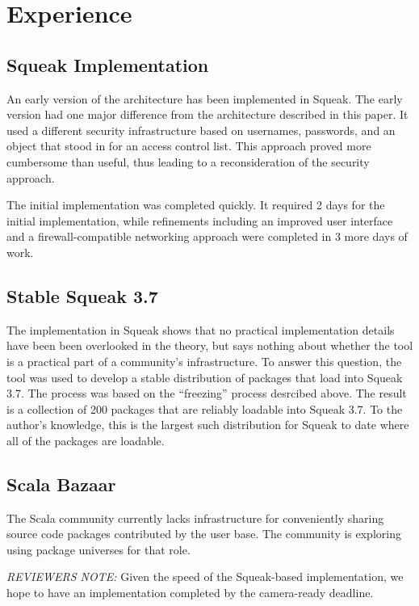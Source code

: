 \documentclass{IEEEtran}
\begin{document}
\section{Experience}
\subsection{Squeak Implementation}
An early version of the architecture has been implemented in Squeak.
The early version had one major difference from the architecture
described in this paper.  It used a different security infrastructure
based on usernames, passwords, and an object that stood in for an
access control list.  This approach proved more cumbersome than
useful, thus leading to a reconsideration of the security approach.

The initial implementation was completed quickly.  It required 2 days
for the initial implementation, while refinements including an
improved user interface and a firewall-compatible networking approach
were completed in 3 more days of work.


\subsection{Stable Squeak 3.7}
The implementation in Squeak shows that no practical implementation
details have been been overlooked in the theory, but says nothing
about whether the tool is a practical part of a community's
infrastructure.  To answer this question, the tool was used to develop
a stable distribution of packages that load into Squeak 3.7.  The
process was based on the ``freezing'' process desrcibed above.  The
result is a collection of 200 packages that are reliably loadable into
Squeak 3.7.
To the author's knowledge, this is the largest such distribution for
Squeak to date where all of the packages are loadable.


\subsection{Scala Bazaar}
The Scala community currently lacks infrastructure for conveniently
sharing source code packages contributed by the user base.  The
community is exploring using package universes for that role.

\emph{REVIEWERS NOTE:} Given the speed of the Squeak-based
implementation, we hope to have an implementation completed by the
camera-ready deadline.
\end{document}
